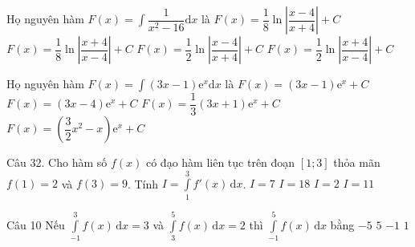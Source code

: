 \begin{ex}%
Họ nguyên hàm $F(x)=\displaystyle\int\dfrac{1}{x^2-16}\mathrm{d}x$ là
\choice
{\True $F(x)=\dfrac{1}{8}\ln\left|\dfrac{x-4}{x+4}\right|+C$}
{$F(x)=\dfrac{1}{8}\ln\left|\dfrac{x+4}{x-4}\right|+C$}
{$F(x)=\dfrac{1}{2}\ln\left|\dfrac{x-4}{x+4}\right|+C$}
{$F(x)=\dfrac{1}{2}\ln\left|\dfrac{x+4}{x-4}\right|+C$}
\end{ex}

\begin{ex}%
Họ nguyên hàm $F(x)=\displaystyle\int(3x-1)\mathrm{e}^x\mathrm{d}x$ là
\choice
{$F(x)=(3x-1)\mathrm{e}^x+C$}
{\True $F(x)=(3x-4)\mathrm{e}^x+C$}
{$F(x)=\dfrac{1}{3}(3x+1)\mathrm{e}^x+C$}
{$F(x)=\left(\dfrac{3}{2}x^2-x\right)\mathrm{e}^x+C$}
\end{ex}

\begin{ex}  Câu 32.%
Cho hàm số $ f(x)$ có đạo hàm liên tục trên đoạn $[1;3]$ thỏa mãn $ f(1)=2$ và $ f(3)=9$. Tính $I=\int\limits_1^3{f'(x)\mathrm{\,d}x}$.
\choice
{\True $I=7$}
{$I=18$}
{$I=2$}
{$I=11$}
\end{ex}

\begin{ex}Câu 10%
Nếu $\displaystyle\int\limits_{-1}^3 f(x)\mathrm{\,d}x=3$ và $\displaystyle\int\limits_3^5 f(x)\mathrm{\,d}x=2$ thì $\displaystyle\int\limits_{-1}^5 f(x)\mathrm{\,d}x$ bằng
\choice
{$-5$}
{\True $5$}
{$-1$}
{$1$}
\end{ex}

